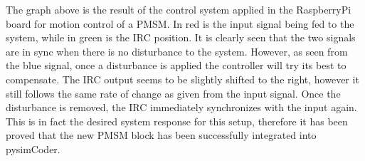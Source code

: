 \quad The graph above is the result of the control system applied in the RaspberryPi board for
motion control of a PMSM. In red is the input signal being fed to the system, while in green is the
IRC position. It is clearly seen that the two signals are in sync when there is no disturbance to
the system. However, as seen from the blue signal, once a disturbance is applied the controller will
try its best to compensate. The IRC output seems to be slightly shifted to the right, however it
still follows the same rate of change as given from the input signal. Once the disturbance is
removed, the IRC immediately synchronizes with the input again. This is in fact the desired system
response for this setup, therefore it has been proved that the new PMSM block has been successfully
integrated into pysimCoder. 
